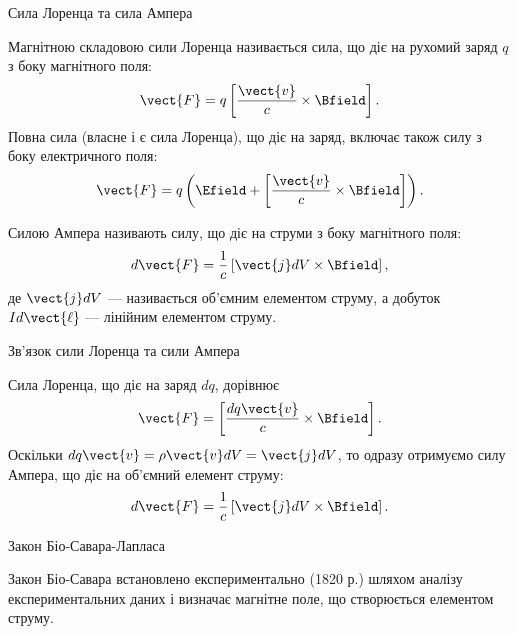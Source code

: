 \documentclass{beamer}
\begin{document}
\begin{frame}{Сила Лоренца та сила Ампера}{}
	\begin{block}{}
		Магнітною складовою сили Лоренца називається сила, що діє на рухомий заряд $q$ з боку магнітного поля:
		\begin{equation*}
			\vect{F} = q\left[\frac{\vect{v}}{c}\times\Bfield\right].
		\end{equation*}
		Повна сила (власне і є сила Лоренца), що діє на заряд, включає також силу з боку електричного поля:
		\begin{equation*}
			\vect{F} = q\left( \Efield + \left[\frac{\vect{v}}{c}\times\Bfield\right] \right) .
		\end{equation*}
	\end{block}
	\begin{block}{}
		\alert{Силою Ампера} називають силу, що діє на струми з боку магнітного поля:
		\begin{equation*}
			d\vect{F} = \frac1c \left[ \vect{j}dV \times \Bfield\right],
		\end{equation*}
		де $\vect{j} dV$ --- називається об'ємним \alert{елементом струму}, а добуток $Id\vect{\ell}$ --- лінійним елементом струму.
	\end{block}
\end{frame}


\begin{frame}{Зв'язок сили Лоренца та сили Ампера}{}
	\begin{block}{}
		Сила Лоренца, що діє на заряд $dq$, дорівнює
		\begin{equation*}
			\vect{F} = \left[\frac{dq \vect{v}}{c}\times\Bfield\right].
		\end{equation*}
		Оскільки $dq \vect{v} = \rho \vect{v} dV = \vect{j} dV$, то одразу отримуємо силу Ампера, що діє на об'ємний елемент струму:
		\begin{equation*}
			d\vect{F} = \frac1c \left[ \vect{j}dV \times \Bfield\right].
		\end{equation*}
	\end{block}
\end{frame}



\begin{frame}{Закон Біо-Савара-Лапласа}{}
	\begin{block}{}\justifying
		Закон Біо-Савара встановлено експериментально (1820 р.) шляхом аналізу експериментальних даних і \alert{визначає магнітне поле, що створюється
			елементом струму}.
	\end{block}
\end{frame}
\end{document}
